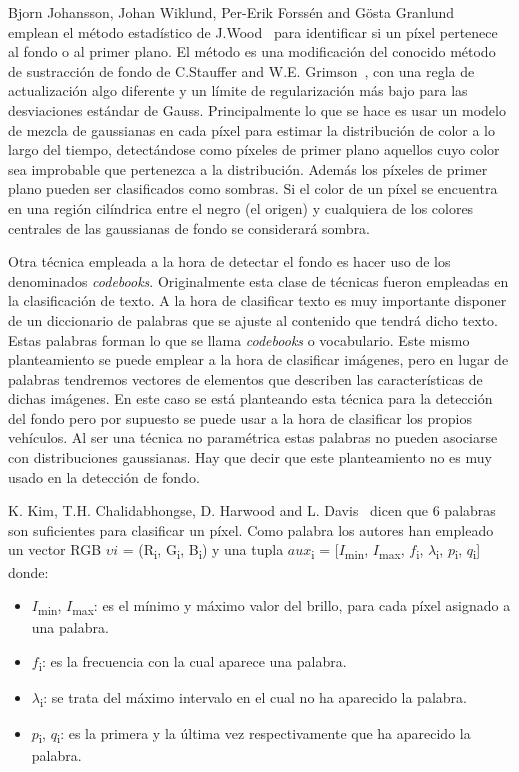 Bjorn Johansson, Johan Wiklund, Per-Erik Forssén and Gösta  Granlund~\cite{combining_shadow} emplean el método estadístico de J.Wood~\cite{wood} para identificar si un píxel pertenece al fondo o al primer plano. El método es una modificación del conocido método de sustracción de fondo de  C.Stauffer and  W.E.  Grimson~\cite{adaptative_background}, con una regla de actualización algo diferente y un límite de regularización más bajo para las desviaciones estándar de Gauss. Principalmente lo que se hace es usar un modelo de mezcla de gaussianas en cada píxel para estimar la distribución de color a lo largo del tiempo, detectándose como píxeles de primer plano aquellos cuyo color sea improbable que pertenezca a la distribución. Además los píxeles de primer plano pueden ser clasificados como sombras. Si el color de un píxel se encuentra en una región cilíndrica entre el negro (el origen) y cualquiera de los colores centrales de las gaussianas de fondo se considerará sombra.


Otra técnica empleada a la hora de detectar el fondo es hacer uso de los denominados \textit{codebooks}. Originalmente esta clase de técnicas fueron empleadas en la clasificación de texto. A la hora de clasificar texto es muy importante disponer de un diccionario de palabras que se ajuste al contenido que tendrá dicho texto. Estas palabras forman lo que se llama  \textit{codebooks} o vocabulario. Este mismo planteamiento se puede emplear a la hora de clasificar imágenes, pero en lugar de palabras tendremos vectores de elementos que describen las características de dichas imágenes.
En este caso se está planteando esta técnica para la detección del fondo pero por supuesto se puede usar a la hora de clasificar los propios vehículos. Al ser una técnica no paramétrica estas palabras no pueden asociarse con distribuciones gaussianas. Hay que decir que este planteamiento no es muy usado en la detección de fondo.

K. Kim, T.H. Chalidabhongse, D. Harwood and L. Davis~\cite{real_time_foreground_background} dicen que 6 palabras son suficientes para clasificar un píxel. Como palabra los autores han empleado un vector RGB $\upsilon i$ = (R\textsubscript{i}, G\textsubscript{i}, B\textsubscript{i}) y una tupla $aux$\textsubscript{i} = [$I$\textsubscript{min}, $I$\textsubscript{max}, $f$\textsubscript{i}, $\lambda$\textsubscript{i}, $p$\textsubscript{i}, $q$\textsubscript{i}] donde:

\begin{itemize}
    \item $I$\textsubscript{min}, $I$\textsubscript{max}: es el mínimo y máximo valor del brillo, para cada píxel asignado a una palabra.
    \item $f$\textsubscript{i}: es la frecuencia con la cual aparece una palabra.
    \item $\lambda$\textsubscript{i}: se trata del máximo intervalo en el cual no ha aparecido la palabra.
    \item $p$\textsubscript{i}, $q$\textsubscript{i}: es la primera y la última vez respectivamente que ha aparecido la palabra.
\end{itemize}

